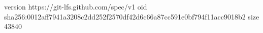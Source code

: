 version https://git-lfs.github.com/spec/v1
oid sha256:0012aff7941a3208c2dd252f2570df42d6c66a87cc591e0bf794f11acc9018b2
size 43840
